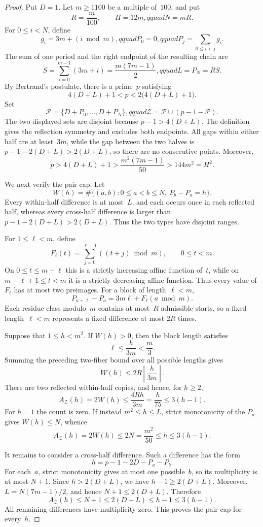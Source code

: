 \begin{proof}
Put $D=1$.
Let $m\ge1100$ be a multiple of~$100$, and put
\[
 R=\frac m{100},\qquad H=12m,qquad N=mR.
\]
For $0\le i<N$, define
\[
 g_i=3m+(i\bmod m),qquad
 P_0=0,qquad P_j=\sum_{0\le i<j}g_i.
\]
The sum of one period and the right endpoint of the resulting chain are
\[
 S=\sum_{i=0}^{m-1}(3m+i)=\frac{m(7m-1)}2,qquad
 L=P_N=RS.
\]
By Bertrand's postulate, there is a prime~$p$ satisfying
\[
 4(D+L)+1<p<2\bigl(4(D+L)+1\bigr).
\]
Set
\[
 \mathcal P=\{D+P_0,\ldots,D+P_N\},qquad
 \mathcal Z=\mathcal P\cup(p-1-\mathcal P).
\]
The two displayed sets are disjoint because $p-1>4(D+L)$.  The definition
gives the reflection symmetry and excludes both endpoints.  All gaps within
either half are at least~$3m$, while the gap between the two halves is
$p-1-2(D+L)>2(D+L)$, so there are no consecutive points.  Moreover,
\[
 p>4(D+L)+1>\frac{m^2(7m-1)}{50}>144m^2=H^2.
\]

We next verify the pair cap.  Let
\[
 W(h)=\#\{(a,b):0\le a<b\le N,\ P_b-P_a=h\}.
\]
Every within-half difference is at most~$L$, and each occurs once in
each reflected half, whereas every cross-half difference is larger than
$p-1-2(D+L)>2(D+L)$.  Thus the two types have disjoint ranges.

For $1\le\ell<m$, define
\[
 F_\ell(t)=\sum_{j=0}^{\ell-1}((t+j)\bmod m),
 \qquad 0\le t<m.
\]
On $0\le t\le m-\ell$ this is a strictly increasing affine function
of~$t$, while on $m-\ell+1\le t<m$ it is a strictly decreasing affine
function.  Thus every value of $F_\ell$ has at most two preimages.
For a block of length~$\ell<m$,
\[
 P_{a+\ell}-P_a=3m\ell+F_\ell(a\bmod m).
\]
Each residue class modulo~$m$ contains at most~$R$ admissible starts,
so a fixed length~$\ell<m$ represents a fixed difference at most
$2R$ times.

Suppose that $1\le h<m^2$.  If $W(h)>0$, then the block length satisfies
\[
 \ell\le\frac{h}{3m}<\frac m3.
\]
Summing the preceding two-fiber bound over all possible lengths gives
\[
 W(h)\le2R\left\lfloor\frac{h}{3m}\right\rfloor.
\]
There are two reflected within-half copies, and hence, for $h\ge2$,
\[
 A_{\mathcal Z}(h)=2W(h)
 \le\frac{4Rh}{3m}=\frac h{75}\le3(h-1).
\]
For $h=1$ the count is zero.  If instead $m^2\le h\le L$, strict
monotonicity of the $P_a$ gives \(W(h)\le N\), whence
\[
 A_{\mathcal Z}(h)=2W(h)\le2N=\frac{m^2}{50}
 \le h\le3(h-1).
\]

It remains to consider a cross-half difference.  Such a difference has
the form
\[
 h=p-1-2D-P_a-P_b.
\]
For each~$a$, strict monotonicity gives at most one possible~$b$, so its
multiplicity is at most $N+1$.  Since $h>2(D+L)$, we have
\(h-1\ge2(D+L)\).  Moreover,
\(L=N(7m-1)/2\), and hence \(N+1\le2(D+L)\).  Therefore
\[
 A_{\mathcal Z}(h)\le N+1\le2(D+L)\le h-1\le3(h-1).
\]
All remaining differences have multiplicity zero.  This proves the pair
cap for every~$h$.


\end{proof}
